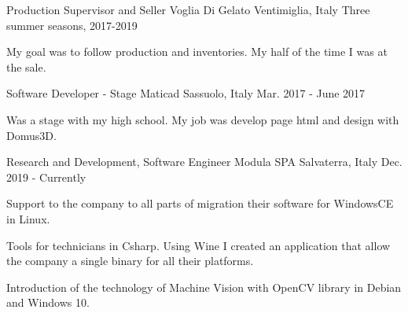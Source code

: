 

\begin{cventries}

  \cventry
    {Production Supervisor and Seller} %
    {Voglia Di Gelato} %
    {Ventimiglia, Italy} %
    {Three summer seasons, 2017-2019} %
    {
      \begin{cvitems} %
        \item {My goal was to follow production and inventories. My half of the time I was at the sale.}
      \end{cvitems}
    }

  \cventry
    {Software Developer - Stage} %
    {Maticad} %
    {Sassuolo, Italy} %
    {Mar. 2017 - June 2017} %
    {
      \begin{cvitems} %
        \item {Was a stage with my high school. My job was develop page html and design with Domus3D. }
      \end{cvitems}
    }

  \cventry
    {Research and Development, Software Engineer} %
    {Modula SPA} %
    {Salvaterra, Italy} %
    {Dec. 2019 - Currently} %
    {
      \begin{cvitems} %
        \item {Support to the company to all parts of migration their software for WindowsCE in Linux. }
        \item {Tools for technicians in Csharp. Using Wine I created an application that allow the company a single binary for all their platforms.  }
        \item {Introduction of the technology of Machine Vision with OpenCV library in Debian and Windows 10. }
      \end{cvitems}
    }

\end{cventries}
